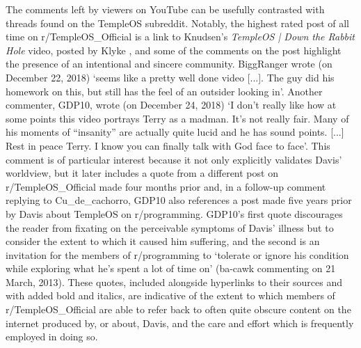 \documentclass[Draft.tex]{subfiles}
\begin{document}
The comments left by viewers on YouTube can be usefully contrasted
with threads found on the TempleOS subreddit\footnotemark.
Notably, the highest rated post of all time on r/TempleOS\_Official
is a link to Knudsen's \textit{TempleOS | Down the Rabbit Hole} video,
posted by Klyke \parencite*{Klyke18},
and some of the comments on the post highlight the presence of
an intentional and sincere community.
BiggRanger wrote (on December 22, 2018)
`seems like a pretty well done video [...].  The guy did his homework on this,
but still has the feel of an outsider looking in'.
Another commenter, GDP10, wrote (on December 24, 2018)
`I don't really like how at some points this video portrays Terry as a madman.
It's not really fair.  Many of his moments of ``insanity''
are actually quite lucid and he has sound points. [...]
Rest in peace Terry.  I know you can finally talk with God face to face'.
This comment is of particular interest because it not only explicitly validates
Davis' worldview, but it later includes a quote from a different post on
r/TempleOS\_Official made four months prior and,
in a follow-up comment replying to Cu\_de\_cachorro, GDP10 also references
a post made five years prior by Davis \parencite*{Davis13}
about TempleOS on r/programming.
GDP10's first quote discourages the reader from fixating on the perceivable
symptoms of Davis' illness but to consider the extent to which it caused him
suffering, and the second is an invitation for the members of r/programming
to `tolerate or ignore his condition
while exploring what he's spent a lot of time on'
(ba-cawk commenting on 21 March, 2013).
These quotes, included alongside hyperlinks to their sources and with added bold and italics,
are indicative of the extent to which members of r/TempleOS\_Official
are able to refer back to often quite obscure content on the internet produced
by, or about, Davis, and the care and effort which is frequently employed
in doing so.
\end{document}

